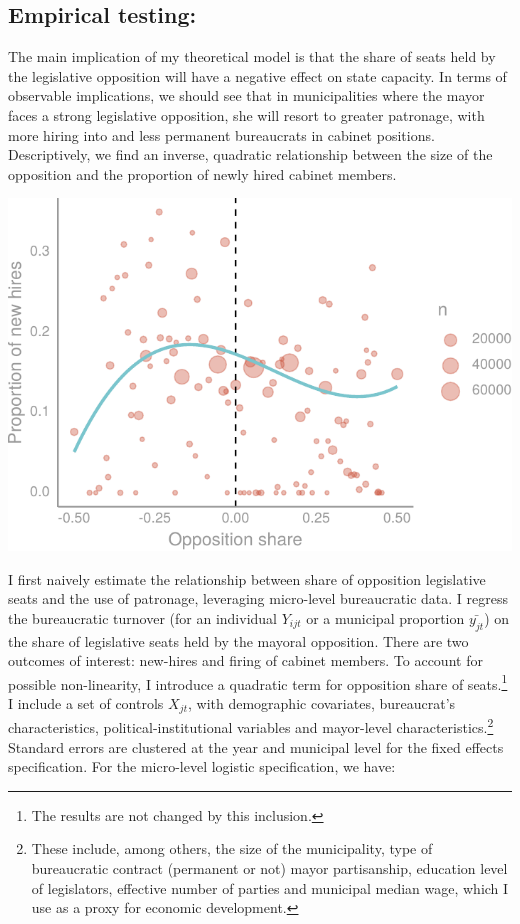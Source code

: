 \documentclass[12pt,]{article}
\let\rmarkdownfootnote\footnote%
\def\footnote{\protect\rmarkdownfootnote}
\begin{document}
\hypertarget{empirical-testing}{%
\subsection{Empirical testing:}\label{empirical-testing}}

The main implication of my theoretical model is that the share of seats
held by the legislative opposition will have a negative effect on state
capacity. In terms of observable implications, we should see that in
municipalities where the mayor faces a strong legislative opposition,
she will resort to greater patronage, with more hiring into and less
permanent bureaucrats in cabinet positions. Descriptively, we find an
inverse, quadratic relationship between the size of the opposition and
the proportion of newly hired cabinet members.

\begin{center}\includegraphics{dissertation_files/figure-latex/visual-1} \end{center}

I first naively estimate the relationship between share of opposition
legislative seats and the use of patronage, leveraging micro-level
bureaucratic data. I regress the bureaucratic turnover (for an
individual \(Y_{ijt}\) or a municipal proportion \(\bar{y_{jt}}\)) on
the share of legislative seats held by the mayoral opposition. There are
two outcomes of interest: new-hires and firing of cabinet members. To
account for possible non-linearity, I introduce a quadratic term for
opposition share of seats.\footnote{The results are not changed by this
  inclusion.} I include a set of controls \(X_{jt}\), with demographic
covariates, bureaucrat's characteristics, political-institutional
variables and mayor-level characteristics.\footnote{These include, among
  others, the size of the municipality, type of bureaucratic contract
  (permanent or not) mayor partisanship, education level of legislators,
  effective number of parties and municipal median wage, which I use as
  a proxy for economic development.} Standard errors are clustered at
the year and municipal level for the fixed effects specification. For
the micro-level logistic specification, we have:
\end{document}
